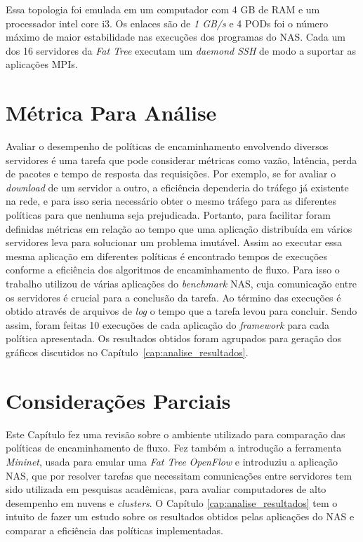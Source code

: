Essa topologia foi emulada em um computador com 4 GB de RAM e um processador intel core i3. Os enlaces são de \textit{1 GB/s} e 4 PODs foi o número máximo de maior estabilidade nas execuções dos programas do NAS. Cada um dos 16 servidores da \textit{Fat Tree} executam um \textit{daemond SSH} de modo a suportar as aplicações MPIs.

\section{Métrica Para Análise}
\label{sec:metrica}
Avaliar o desempenho de políticas de encaminhamento envolvendo diversos servidores é uma tarefa que pode considerar métricas como vazão, latência, perda de pacotes e tempo de resposta das requisições. Por exemplo, se for avaliar o \textit{download} de um servidor a outro, a eficiência dependeria do tráfego já existente na rede, e para isso seria necessário obter o mesmo tráfego para as diferentes políticas para que nenhuma seja prejudicada. Portanto, para facilitar foram definidas métricas em relação ao tempo que uma aplicação distribuída em vários servidores leva para solucionar um problema imutável. Assim ao executar essa mesma aplicação em diferentes políticas é encontrado tempos de execuções conforme a eficiência dos algoritmos de encaminhamento de fluxo.
Para isso o trabalho utilizou de várias aplicações do \textit{benchmark} NAS, cuja comunicação entre os servidores é crucial para a conclusão da tarefa. Ao término das execuções é obtido através de arquivos de \textit{log} o tempo que a tarefa levou para concluir. Sendo assim, foram feitas 10 execuções de cada aplicação do \textit{framework} para cada política apresentada. Os resultados obtidos foram agrupados para geração dos gráficos discutidos no Capítulo~\ref{cap:analise_resultados}.

\section{Considerações Parciais}
Este Capítulo fez uma revisão sobre o ambiente utilizado para comparação das políticas de encaminhamento de fluxo. Fez também a introdução a ferramenta \emph{Mininet}, usada para emular uma \emph{Fat Tree} \emph{OpenFlow} e introduziu a aplicação NAS, que por resolver tarefas que necessitam comunicações entre servidores tem sido utilizada em pesquisas acadêmicas, para avaliar computadores de alto desempenho em nuvens e \textit{clusters}. O Capítulo \ref{cap:analise_resultados} tem o intuito de fazer um estudo sobre os resultados obtidos pelas aplicações do NAS e comparar a eficiência das políticas implementadas.